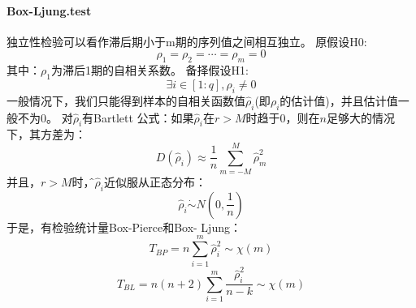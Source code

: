             \paragraph{Box-Ljung.test}
            独立性检验可以看作滞后期小于m期的序列值之间相互独立。
            原假设H0:
            \[{\rho _1} = {\rho _2} = \cdots = {\rho _m} = 0\]
            其中：$\rho_1$为滞后1期的自相关系数。
            备择假设H1:
            \[\exists i \in [1:q],{\rho _i} \ne 0\]
            一般情况下，我们只能得到样本的自相关函数值$̂\hat{\rho}_{i}$(即$\rho_i$的估计值)，并且估计值一般不为0。 对$̂\hat{\rho}_{i}$有Bartlett 公式：如果$̂\hat{\rho}_{i}$在$r>M$时趋于0，则在$n$足够大的情况下，其方差为：
            \[D\left( {{{\hat \rho }_i}} \right) \approx \frac{1}{n}\sum\limits_{m =  - M}^M {\hat \rho _m^2} \]
            并且，$r>M$时，$̂\hat{\rho}_{i}$近似服从正态分布：
            \[{\hat \rho _i}\dot  \sim N\left( {0,\frac{1}{n}} \right)\]
            于是，有检验统计量Box-Pierce和Box- Ljung：
            \[{T_{BP}} = n\sum\limits_{i = 1}^m {\hat \rho _i^2}  \sim \chi \left( m \right)\]
            \[{T_{BL}} = n\left( {n + 2} \right)\sum\limits_{i = 1}^m {\frac{{\hat \rho _i^2}}{{n - k}}}  \sim \chi \left( m \right)\]
